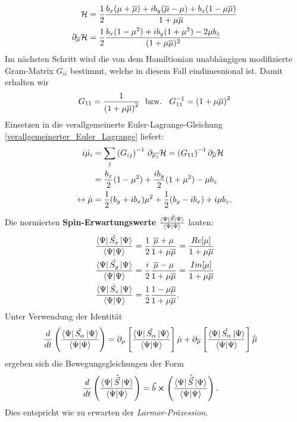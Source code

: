 \begin{align}
    \mathcal{H} &= \frac{1}{2}\frac{b_x(\mu +\overline{\mu}) + ib_y(\overline{\mu} - \mu) + b_z(1-\mu\overline{\mu}) }{1+\mu\overline{\mu}}    \\
    \partial_{\overline{\mu}} \mathcal{H} &= \frac{1}{2} \frac{b_x(1-\mu^2) + ib_y(1+\mu^2) - 2\mu b_z}{(1+\mu\overline{\mu})^2} 
\end{align}
\noindent Im nächsten Schritt wird die von dem Hamiltionian unabhängigen modifizierte Gram-Matrix $G_{ii}$ bestimmt, 
welche in diesem Fall eindimesnional ist.
Damit erhalten wir
\begin{align}
    G_{11} = \frac{1}{\left(1 + \mu\overline{\mu}\right)^2} \text{\space\space bzw.\space\space } G_{11}^{-1} = \left(1 + \mu\overline{\mu}\right)^2
\end{align}
\noindent Einsetzen in die verallgemeinerte Euler-Lagrange-Gleichung \autoref{verallgemeinerter_Euler_Lagrange} liefert:
\begin{align}
    i\dot{\mu_i} &= \sum_{j}\left(G_{ij}\right)^{-1}\thinspace \partial_{\overline{\mu_j}}\mathcal{H} = \left(G_{11}\right)^{-1}\partial_{\overline{\mu}} \mathcal{H} \\
    &= \frac{b_x}{2}(1-\mu^2) + \frac{i b_y }{2}(1+\mu^2) -\mu b_z   \label{Larmor} \\ 
    \leftrightarrow \dot{\mu} &= \frac{1}{2}(b_y + ib_x)\mu^2 + \frac{1}{2}(b_y - ib_x) +i\mu b_z .
\end{align}
Die normierten \textbf{Spin-Erwartungswerte} $\frac{\bra{\Psi}\hat{\vec{S}}\ket{\Psi}}{\bra{\Psi}\ket{\Psi}}$ lauten:
\begin{align}
    \frac{\bra{\Psi}\hat{S_x}\ket{\Psi}}{\bra{\Psi}\ket{\Psi}} &= \frac{1}{2}\frac{\overline{\mu} + \mu}{1+\mu\overline{\mu}} = \frac{Re[\mu]}{1 + \mu\overline{\mu}} \\
    \frac{\bra{\Psi}\hat{S_y}\ket{\Psi}}{\bra{\Psi}\ket{\Psi}} &= \frac{i}{2}\frac{\overline{\mu} - \mu}{1+\mu\overline{\mu}} = \frac{Im[\mu]}{1 + \mu\overline{\mu}} \\
    \frac{\bra{\Psi}\hat{S_z}\ket{\Psi}}{\bra{\Psi}\ket{\Psi}} &= \frac{1}{2}\frac{1 - \mu\overline{\mu}}{1 + \mu\overline{\mu}}  .
\end{align}
Unter Verwendung der Identität 
\begin{align}
    \frac{d}{dt}\left(\frac{\bra{\Psi}\hat{S_\alpha}\ket{\Psi}}{\bra{\Psi}\ket{\Psi}}\right) &= \partial_{\mu}\left[\frac{\bra{\Psi}\hat{S_\alpha}\ket{\Psi}}{\bra{\Psi}\ket{\Psi}}\right]\dot{\mu} 
    + \partial_{\overline{\mu}}\left[\frac{\bra{\Psi}\hat{S_\alpha}\ket{\Psi}}{\bra{\Psi}\ket{\Psi}}\right]\dot{\overline{\mu}}\label{dS_dt}
\end{align}
ergeben sich die Bewegungsgleichungen der Form
\begin{align}
    \frac{d}{dt}\left(\frac{\bra{\Psi}\hat{\vec{S}}\ket{\Psi}}{\bra{\Psi}\ket{\Psi}}\right) &= \vec{b} \cross \left(\frac{\bra{\Psi}\hat{\vec{S}}\ket{\Psi}}{\bra{\Psi}\ket{\Psi}}\right).
\end{align}
Dies entspricht wie zu erwarten der \textit{Larmor-Präzession}.


